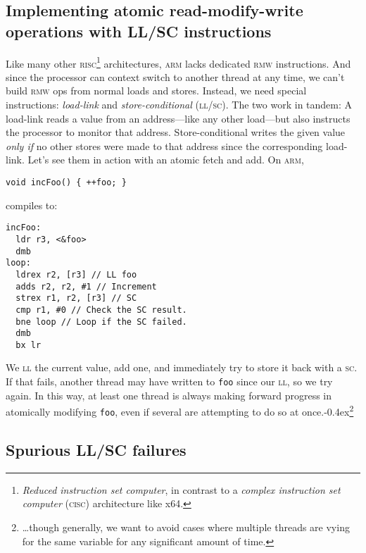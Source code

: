 \documentclass[fontsize=\bodyfontsize, numbers=endperiod]{scrartcl}
\newcommand{\codesize}{\fontsize{\bodyfontsize}{\bodybaselineskip}}
\newcommand{\punckern}{\kern-0.4ex}
\newcommand{\introduce}[1]{\textit{#1}}
\newenvironment{colfigure}
  {\par\vspace{1\baselineskip minus 0.5\baselineskip}\noindent\minipage{\linewidth}}
  {\endminipage\vspace{1\baselineskip minus 0.7\baselineskip}}
\begin{document}
\begin{multicols}{2}
\section{Implementing atomic read-modify-write operations with LL/SC instructions}

Like many other
\textsc{risc}\footnote{\introduce{Reduced instruction set computer},
in contrast to a \introduce{complex instruction set computer} \textsc{(cisc)}
architecture like x64.}
architectures, \textsc{arm} lacks dedicated \textsc{rmw} instructions.
And since the processor can context switch to another thread
at any time,
we can't build \textsc{rmw} ops from normal loads and stores.
Instead, we need special instructions:
\introduce{load-link} and \introduce{store-conditional} \textsc{(ll/sc)}.
The two work in tandem:
A load-link reads a value from an address---like any other load---but also
instructs the processor to monitor that address.
Store-conditional writes the given value \emph{only if}
no other stores were made to that address
since the corresponding load-link.
Let's see them in action with an atomic fetch and add.
On \textsc{arm},
\begin{colfigure}
\begin{verbatim}
void incFoo() { ++foo; }
\end{verbatim}
compiles to:
\begin{lstlisting}[language={[ARM]Assembler}]
incFoo:
  ldr r3, <&foo>
  dmb
loop:
  ldrex r2, [r3] // LL foo
  adds r2, r2, #1 // Increment
  strex r1, r2, [r3] // SC
  cmp r1, #0 // Check the SC result.
  bne loop // Loop if the SC failed.
  dmb
  bx lr
\end{lstlisting}
\end{colfigure}
We \textsc{ll} the current value, add one, and immediately try to store it back
with a \textsc{sc}. If that fails, another thread may have
written to \texttt{foo} since our \textsc{ll},
so we try again.
In this way, at least one thread is always making forward progress in atomically
modifying \texttt{foo}, even if several are attempting to do so at
once.\punckern\footnote{\ldots though generally,
we want to avoid cases where multiple threads are vying for the same variable
for any significant amount of time.}

\subsection{Spurious LL/SC failures}
\label{spurious-ll/sc-failures}


\end{multicols}
\end{document}
